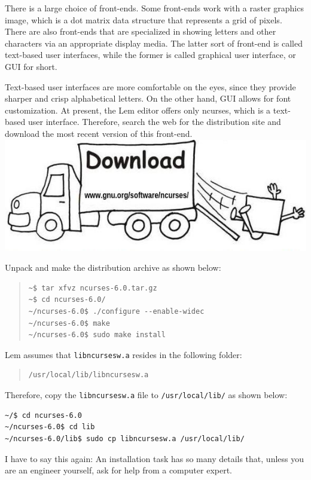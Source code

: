 \documentclass[a4paper,12pt]{book}
\begin{document}
There is a large choice of front-ends. Some front-ends 
work with a raster graphics image, which  is a dot matrix 
data structure that represents a grid of pixels. 
There are also front-ends that are specialized in
showing letters and other characters via an appropriate
display media. The latter sort of front-end is called
text-based user interfaces, while the former is called
graphical user interface, or GUI for short.

Text-based user interfaces are more comfortable on the
eyes, since they  provide sharper and crisp alphabetical
letters. On the other hand, GUI allows for font
customization. At present, the Lem editor offers only
ncurses, which is a text-based user interface. Therefore,
search the web for the distribution site and download the
most recent version of this front-end.\\

\includegraphics[scale=0.6]{figs-prefix/download.jpg}

Unpack and make the distribution archive as shown below:
\begin{quote}
\begin{verbatim}
~$ tar xfvz ncurses-6.0.tar.gz
~$ cd ncurses-6.0/
~/ncurses-6.0$ ./configure --enable-widec
~/ncurses-6.0$ make
~/ncurses-6.0$ sudo make install
\end{verbatim}
\end{quote}
Lem assumes that  \verb|libncursesw.a| resides in the
following folder:
\begin{quote}
\begin{verbatim}
/usr/local/lib/libncursesw.a 
\end{verbatim}
\end{quote}
Therefore, copy the \verb|libncursesw.a| file to
\verb|/usr/local/lib/| as shown below:
\begin{verbatim}
~/$ cd ncurses-6.0 
~/ncurses-6.0$ cd lib 
~/ncurses-6.0/lib$ sudo cp libncursesw.a /usr/local/lib/
\end{verbatim}

I have to say this again: An installation task has so
many details that, unless you are an engineer yourself, 
ask for help from a computer expert.
\end{document}
